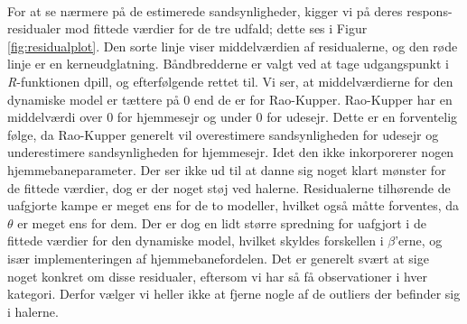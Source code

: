 \documentclass[11pt,a4paper]{article}
\begin{document}
 \\
\newpage 
For at se nærmere på de estimerede sandsynligheder, kigger vi på deres respons-residualer mod fittede værdier for de tre udfald; dette ses i Figur \ref{fig:residualplot}. Den sorte linje viser middelværdien af residualerne, og den røde linje er en kerneudglatning. Båndbredderne er valgt ved at tage udgangspunkt i \textit{R}-funktionen {\selectfont dpill}, og efterfølgende rettet til. Vi ser, at middelværdierne for den dynamiske model er tættere på 0 end de er for Rao-Kupper. Rao-Kupper har en middelværdi over 0 for hjemmesejr og under 0 for udesejr. Dette er en forventelig følge, da Rao-Kupper generelt vil overestimere sandsynligheden for udesejr og underestimere sandsynligheden for hjemmesejr. Idet den ikke inkorporerer nogen hjemmebaneparameter. Der ser ikke ud til at danne sig noget klart mønster for de fittede værdier, dog er der noget støj ved halerne. Residualerne tilhørende de uafgjorte kampe er meget ens for de to modeller, hvilket også måtte forventes, da $\theta$ er meget ens for dem. Der er dog en lidt større spredning for uafgjort i de fittede værdier for den dynamiske model, hvilket skyldes forskellen i $\beta$'erne, og især implementeringen af hjemmebanefordelen. Det er generelt svært at sige noget konkret om disse residualer, eftersom vi har så få observationer i hver kategori. Derfor vælger vi heller ikke at fjerne nogle af de outliers der befinder sig i halerne.
\end{document}

